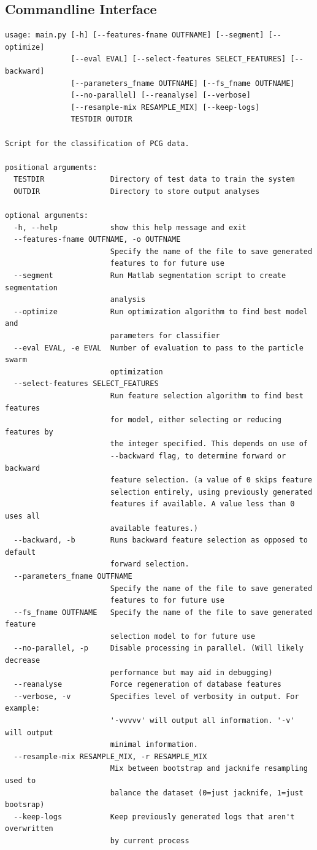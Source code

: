 \documentclass[titlepage, 12pt]{scrartcl} \usepackage{enumitem}
\begin{document}
\subsection{Commandline Interface}
\singlespacing
\lstset{basicstyle=\scriptsize, style=mystyle}
\begin{lstlisting}[numbers=none]
usage: main.py [-h] [--features-fname OUTFNAME] [--segment] [--optimize]
               [--eval EVAL] [--select-features SELECT_FEATURES] [--backward]
               [--parameters_fname OUTFNAME] [--fs_fname OUTFNAME]
               [--no-parallel] [--reanalyse] [--verbose]
               [--resample-mix RESAMPLE_MIX] [--keep-logs]
               TESTDIR OUTDIR

Script for the classification of PCG data.

positional arguments:
  TESTDIR               Directory of test data to train the system
  OUTDIR                Directory to store output analyses

optional arguments:
  -h, --help            show this help message and exit
  --features-fname OUTFNAME, -o OUTFNAME
                        Specify the name of the file to save generated
                        features to for future use
  --segment             Run Matlab segmentation script to create segmentation
                        analysis
  --optimize            Run optimization algorithm to find best model and
                        parameters for classifier
  --eval EVAL, -e EVAL  Number of evaluation to pass to the particle swarm
                        optimization
  --select-features SELECT_FEATURES
                        Run feature selection algorithm to find best features
                        for model, either selecting or reducing features by
                        the integer specified. This depends on use of
                        --backward flag, to determine forward or backward
                        feature selection. (a value of 0 skips feature
                        selection entirely, using previously generated
                        features if available. A value less than 0 uses all
                        available features.)
  --backward, -b        Runs backward feature selection as opposed to default
                        forward selection.
  --parameters_fname OUTFNAME
                        Specify the name of the file to save generated
                        features to for future use
  --fs_fname OUTFNAME   Specify the name of the file to save generated feature
                        selection model to for future use
  --no-parallel, -p     Disable processing in parallel. (Will likely decrease
                        performance but may aid in debugging)
  --reanalyse           Force regeneration of database features
  --verbose, -v         Specifies level of verbosity in output. For example:
                        '-vvvvv' will output all information. '-v' will output
                        minimal information.
  --resample-mix RESAMPLE_MIX, -r RESAMPLE_MIX
                        Mix between bootstrap and jacknife resampling used to
                        balance the dataset (0=just jacknife, 1=just bootsrap)
  --keep-logs           Keep previously generated logs that aren't overwritten
                        by current process
\end{lstlisting}
\doublespacing


\pagebreak{}
\printbibliography{}
\end{document}
